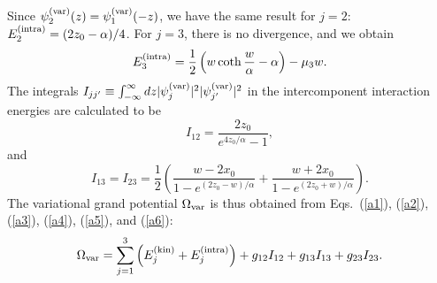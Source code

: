 \documentclass[pra,aps,superscriptaddress,twocolumn,color]{revtex4-1}
\begin{document}
Since $\psi_2^{\rm (var)}(z) = \psi_1^{\rm (var)}(-z)$, we have the same
result for $j = 2$: $E_2^{\rm (intra)} = (2 z_0 - \alpha) / 4$.
For $j = 3$, there is no divergence, and we obtain
\begin{equation} \label{a4}
  E_3^{\rm (intra)} = \frac{1}{2} \left( w \coth \frac{w}{\alpha} - \alpha
  \right) - \mu_3 w.
\end{equation}
The integrals $I_{jj'} \equiv \int_{-\infty}^\infty dz
|\psi_j^{\rm (var)}|^2 |\psi_{j'}^{\rm (var)}|^2$ in the intercomponent
interaction energies are calculated to be
\begin{equation} \label{a5}
  I_{12} = \frac{2z_0}{e^{4 z_0 / \alpha} - 1},
\end{equation}
and
\begin{equation} \label{a6}
  I_{13} = I_{23} = \frac{1}{2} \left(
  \frac{w - 2 x_0}{1 - e^{(2 z_0 - w) / \alpha}} 
  + \frac{w + 2 x_0}{1 - e^{(2 z_0 + w) / \alpha}} \right).
\end{equation}
The variational grand potential $\Omega_{\rm var}$ is thus obtained from
Eqs.~(\ref{a1}), (\ref{a2}), (\ref{a3}), (\ref{a4}), (\ref{a5}), and
(\ref{a6}):
\begin{equation}
  \Omega_{\rm var} = \sum_{j=1}^3 \left( E_j^{\rm (kin)} + E_j^{\rm (intra)}
  \right) + g_{12} I_{12} + g_{13} I_{13} + g_{23} I_{23}.
\end{equation}
\end{document}
